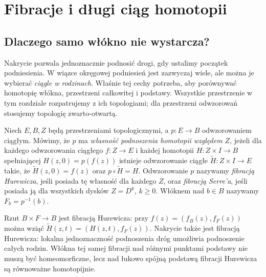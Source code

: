 \chapter{Fibracje i długi ciąg homotopii}
\label{ch:fibracje-v4}

\providecommand{\atlasref}[2]{#2}


\section{Dlaczego samo włókno nie wystarcza?}
Nakrycie pozwala jednoznacznie podnosić drogi, gdy ustalimy początek podniesienia. W wiązce
okręgowej podniesień jest zazwyczaj wiele, ale można je wybierać
\emph{ciągle w rodzinach}. Właśnie tej cechy potrzeba, aby porównywać
homotopię włókna, przestrzeni całkowitej i podstawy. Wszystkie
przestrzenie w tym rozdziale rozpatrujemy z ich topologiami; dla
przestrzeni odwzorowań stosujemy topologię zwarto-otwartą.

\begin{definicja}
Niech $E,B,Z$ będą przestrzeniami topologicznymi,
a $p:E\to B$ odwzorowaniem ciągłym.
Mówimy, że $p$ ma \emph{własność podnoszenia homotopii
względem $Z$}, jeżeli dla każdego odwzorowania ciągłego
$f:Z\to E$ i każdej homotopii $H:Z\times I\to B$
spełniającej $H(z,0)=p(f(z))$ istnieje odwzorowanie ciągłe
$\widetilde H:Z\times I\to E$ takie, że
$\widetilde H(z,0)=f(z)$ oraz $p\circ\widetilde H=H$.
Odwzorowanie $p$ nazywamy \emph{fibracją Hurewicza}, jeśli posiada tę
własność dla każdego $Z$, oraz \emph{fibracją Serre'a}, jeśli posiada ją
dla wszystkich dysków $Z=D^k$, $k\ge0$. Włóknem nad $b\in B$ nazywamy
$F_b=p^{-1}(b)$.
\end{definicja}

\begin{przyklad}
Rzut $B\times F\to B$ jest fibracją Hurewicza: przy
$f(z)=(f_B(z),f_F(z))$ można wziąć
$\widetilde H(z,t)=(H(z,t),f_F(z))$. Nakrycie także jest fibracją
Hurewicza: lokalna jednoznaczność podnoszenia dróg umożliwia
podnoszenie całych rodzin. Włókna tej samej fibracji nad różnymi punktami podstawy nie
muszą być homeomorficzne, lecz nad łukowo spójną podstawą
fibracji Hurewicza są równoważne homotopijnie.
\end{przyklad}

